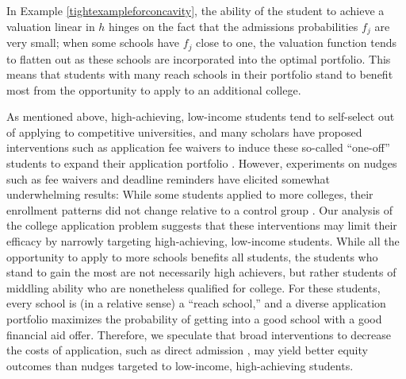 In Example \ref{tightexampleforconcavity}, the ability of the student to achieve a valuation linear in $h$ hinges on the fact that the admissions probabilities $f_j$ are very small; when some schools have $f_j$ close to one, the valuation function tends to flatten out as these schools are incorporated into the optimal portfolio. This means that students with many reach schools in their portfolio stand to benefit most from the opportunity to apply to an additional college.

As mentioned above, high-achieving, low-income students tend to self-select out of applying to competitive universities, and many scholars have proposed interventions such as application fee waivers to induce these so-called  ``one-off'' students to expand their application portfolio \cite{hoxbyandavery2012,hoxbyandturner2013}. However, experiments on nudges such as fee waivers and deadline reminders have elicited somewhat underwhelming results: While some students applied to more colleges, their enrollment patterns did not change relative to a control group \cite{gurantzetal2021}. Our analysis of the college application problem suggests that these interventions may limit their efficacy by narrowly targeting high-achieving, low-income students. While all the opportunity to apply to more schools benefits all students, the students who stand to gain the most are not necessarily high achievers, but rather students of middling ability who are nonetheless qualified for college. For these students, every school is (in a relative sense) a ``reach school,'' and a diverse application portfolio maximizes the probability of getting into a good school with a good financial aid offer. Therefore, we speculate that broad interventions to decrease the costs of application, such as direct admission \cite{jaschik2022}, may yield better equity outcomes than nudges targeted to low-income, high-achieving students.





